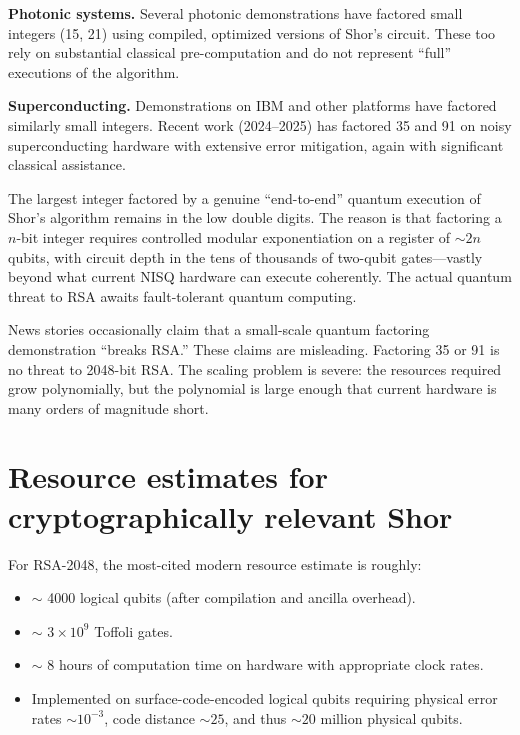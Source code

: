 \textbf{Photonic systems.} Several photonic demonstrations have factored small integers (15, 21) using compiled, optimized versions of Shor's circuit. These too rely on substantial classical pre-computation and do not represent ``full'' executions of the algorithm.

\textbf{Superconducting.} Demonstrations on IBM and other platforms have factored similarly small integers. Recent work (2024--2025) has factored 35 and 91 on noisy superconducting hardware with extensive error mitigation, again with significant classical assistance.

The largest integer factored by a genuine ``end-to-end'' quantum execution of Shor's algorithm remains in the low double digits. The reason is that factoring a $n$-bit integer requires controlled modular exponentiation on a register of $\sim 2n$ qubits, with circuit depth in the tens of thousands of two-qubit gates---vastly beyond what current NISQ hardware can execute coherently. The actual quantum threat to RSA awaits fault-tolerant quantum computing.

\begin{remark}
News stories occasionally claim that a small-scale quantum factoring demonstration ``breaks RSA.'' These claims are misleading. Factoring 35 or 91 is no threat to 2048-bit RSA. The scaling problem is severe: the resources required grow polynomially, but the polynomial is large enough that current hardware is many orders of magnitude short.
\end{remark}

\section{Resource estimates for cryptographically relevant Shor}

For RSA-2048, the most-cited modern resource estimate is roughly:
\begin{itemize}
  \item $\sim$ 4000 logical qubits (after compilation and ancilla overhead).
  \item $\sim$ $3 \times 10^9$ Toffoli gates.
  \item $\sim$ 8 hours of computation time on hardware with appropriate clock rates.
  \item Implemented on surface-code-encoded logical qubits requiring physical error rates $\sim 10^{-3}$, code distance $\sim 25$, and thus $\sim 20$ million physical qubits.
\end{itemize}

